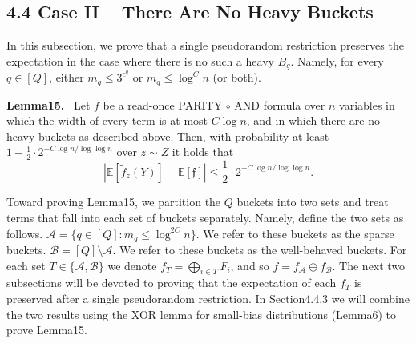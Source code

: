 \documentclass[10pt,a4paper]{article}
\newenvironment{authorclaim}[1]{\par\medskip\noindent\textbf{#1.}\ \ignorespaces}{\par\medskip}
\begin{document}
\subsection*{4.4 Case II -- There Are No Heavy Buckets}
In this subsection, we prove that a single pseudorandom restriction preserves the expectation in the case where there is no such a heavy $B_q$. Namely, for every $q\in[Q]$, either $m_q\le3^{c^q}$ or $m_q\le\log^C n$ (or both).
\begin{authorclaim}{Lemma15}
Let $f$ be a read-once PARITY $\circ$ AND formula over $n$ variables in which the width of every term is at most $C\log n$, and in which there are no heavy buckets as described above. Then, with probability at least $1-\frac12\cdot2^{-C\log n/\log\log n}$ over $z\sim Z$ it holds that
\[
|\mathbb E[\widetilde f_z(Y)]-\mathbb E[\mathfrak f]|
\le\frac12\cdot2^{-C\log n/\log\log n}.
\]
\end{authorclaim}
Toward proving Lemma15, we partition the $Q$ buckets into two sets and treat terms that fall into each set of buckets separately. Namely, define the two sets as follows. $\mathcal A=\{q\in[Q]:m_q\le\log^{2C}n\}$. We refer to these buckets as the sparse buckets. $\mathcal B=[Q]\setminus\mathcal A$. We refer to these buckets as the well-behaved buckets.
For each set $T\in\{\mathcal A,\mathcal B\}$ we denote $f_T=\bigoplus_{i\in T}F_i$, and so $f=f_{\mathcal A}\oplus f_{\mathcal B}$. The next two subsections will be devoted to proving that the expectation of each $f_T$ is preserved after a single pseudorandom restriction. In Section4.4.3 we will combine the two results using the XOR lemma for small-bias distributions (Lemma6) to prove Lemma15.
\end{document}
